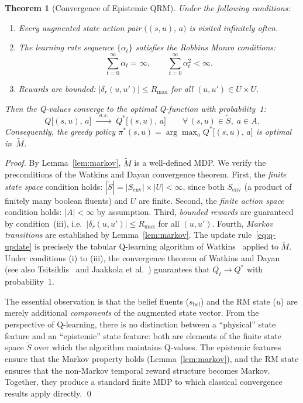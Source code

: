 \documentclass[11pt]{article}
\newtheorem{theorem}{Theorem}[section]
\begin{document}
\begin{theorem}[Convergence of Epistemic QRM]
\label{thm:convergence}
Under the following conditions:
\begin{enumerate}[label=(\roman*)]
    \item Every augmented state action pair $\bigl((s, u),\, a\bigr)$ is visited infinitely often.
    \item The learning rate sequence $\{\alpha_t\}$ satisfies the Robbins Monro conditions:
    \[
        \sum_{t=0}^{\infty} \alpha_t = \infty, \qquad \sum_{t=0}^{\infty} \alpha_t^2 < \infty.
    \]
    \item Rewards are bounded: $|\delta_r(u, u')| \leq R_{\max}$ for all $(u, u') \in U \times U$.
\end{enumerate}
Then the Q-values converge to the optimal Q-function with probability~1:
\[
    Q\bigl[(s, u),\, a\bigr] \;\xrightarrow{\;\;a.s.\;\;}\; Q^*\bigl[(s, u),\, a\bigr]
    \qquad \forall\, (s, u) \in \tilde{S},\; a \in A.
\]
Consequently, the greedy policy $\pi^*(s, u) = \arg\max_a Q^*\bigl[(s, u),\, a\bigr]$ is optimal in~$\tilde{M}$.
\end{theorem}

\begin{proof}
By Lemma~\ref{lem:markov}, $\tilde{M}$ is a well-defined MDP.  We verify the preconditions of the Watkins and Dayan convergence theorem.
First, the \emph{finite state space} condition holds: $|\tilde{S}| = |S_{\mathrm{env}}| \times |U| < \infty$, since both $S_{\mathrm{env}}$ (a product of finitely many boolean fluents) and $U$ are finite.
Second, the \emph{finite action space} condition holds: $|A| < \infty$ by assumption.
Third, \emph{bounded rewards} are guaranteed by condition~(iii), i.e.\ $|\delta_r(u,u')| \leq R_{\max}$ for all $(u, u')$.
Fourth, \emph{Markov transitions} are established by Lemma~\ref{lem:markov}.
The update rule~\eqref{eq:q-update} is precisely the tabular Q-learning algorithm of Watkins~\cite{watkins1992} applied to $\tilde{M}$.  Under conditions (i) to (iii), the convergence theorem of Watkins and Dayan~\cite{watkins1992} (see also Tsitsiklis~\cite{tsitsiklis1994} and Jaakkola et al.~\cite{jaakkola1994}) guarantees that $Q_t \to Q^*$ with probability~1.

The essential observation is that the belief fluents ($s_{\mathrm{bel}}$) and the RM state ($u$) are merely additional \emph{components} of the augmented state vector.  From the perspective of Q-learning, there is no distinction between a ``physical'' state feature and an ``epistemic'' state feature: both are elements of the finite state space $\tilde{S}$ over which the algorithm maintains Q-values.  The epistemic features ensure that the Markov property holds (Lemma~\ref{lem:markov}), and the RM state ensures that the non-Markov temporal reward structure becomes Markov.  Together, they produce a standard finite MDP to which classical convergence results apply directly. \qed
\end{proof}
\end{document}
